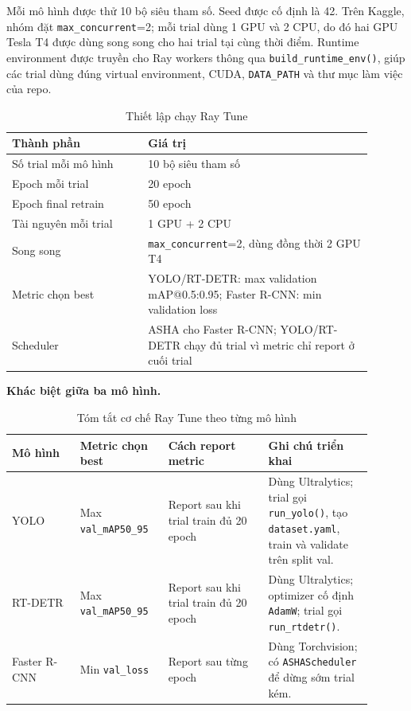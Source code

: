 Mỗi mô hình được thử 10 bộ siêu tham số. Seed được cố định là 42. Trên Kaggle, nhóm đặt \texttt{max\_concurrent}=2; mỗi trial dùng 1 GPU và 2 CPU, do đó hai GPU Tesla T4 được dùng song song cho hai trial tại cùng thời điểm. Runtime environment được truyền cho Ray workers thông qua \texttt{build\_runtime\_env()}, giúp các trial dùng đúng virtual environment, CUDA, \texttt{DATA\_PATH} và thư mục làm việc của repo.

\begin{table}[H]
    \centering
    \caption{Thiết lập chạy Ray Tune}
    \label{tab:raytune-process}
    \begin{tabular}{@{}p{0.34\linewidth} p{0.56\linewidth}@{}}
        \toprule
        \textbf{Thành phần} & \textbf{Giá trị} \\
        \midrule
        Số trial mỗi mô hình & 10 bộ siêu tham số \\
        Epoch mỗi trial & 20 epoch \\
        Epoch final retrain & 50 epoch \\
        Tài nguyên mỗi trial & 1 GPU + 2 CPU \\
        Song song & \texttt{max\_concurrent}=2, dùng đồng thời 2 GPU T4 \\
        Metric chọn best & YOLO/RT-DETR: max validation mAP@0.5:0.95; Faster R-CNN: min validation loss \\
        Scheduler & ASHA cho Faster R-CNN; YOLO/RT-DETR chạy đủ trial vì metric chỉ report ở cuối trial \\
        \bottomrule
    \end{tabular}
\end{table}

\textbf{Khác biệt giữa ba mô hình.}

\begin{table}[H]
    \centering
    \caption*{Tóm tắt cơ chế Ray Tune theo từng mô hình}
    \small
    \begin{tabular}{@{}p{0.17\linewidth} p{0.22\linewidth} p{0.25\linewidth} p{0.26\linewidth}@{}}
        \toprule
        \textbf{Mô hình} & \textbf{Metric chọn best} & \textbf{Cách report metric} & \textbf{Ghi chú triển khai} \\
        \midrule
        YOLO & Max \texttt{val\_mAP50\_95} & Report sau khi trial train đủ 20 epoch & Dùng Ultralytics; trial gọi \texttt{run\_yolo()}, tạo \texttt{dataset.yaml}, train và validate trên split val. \\
        RT-DETR & Max \texttt{val\_mAP50\_95} & Report sau khi trial train đủ 20 epoch & Dùng Ultralytics; optimizer cố định \texttt{AdamW}; trial gọi \texttt{run\_rtdetr()}. \\
        Faster R-CNN & Min \texttt{val\_loss} & Report sau từng epoch & Dùng Torchvision; có \texttt{ASHAScheduler} để dừng sớm trial kém. \\
        \bottomrule
    \end{tabular}
\end{table}

